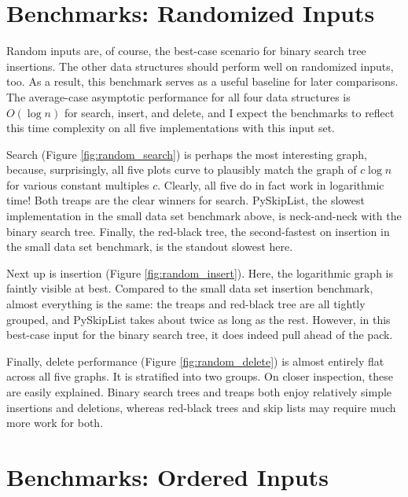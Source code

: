 \documentclass{article}
\begin{document}
\section{Benchmarks: Randomized Inputs}
Random inputs are, of course, the best-case scenario for binary search tree insertions. The other data structures should perform well on randomized inputs, too. As a result, this benchmark serves as a useful baseline for later comparisons. The average-case asymptotic performance for all four data structures is $O(\log n)$ for search, insert, and delete, and I expect the benchmarks to reflect this time complexity on all five implementations with this input set.

Search (Figure \ref{fig:random_search}) is perhaps the most interesting graph, because, surprisingly, all five plots curve to plausibly match the graph of $c \log n$ for various constant multiples $c$. Clearly, all five do in fact work in logarithmic time! Both treaps are the clear winners for search. PySkipList, the slowest implementation in the small data set benchmark above, is neck-and-neck with the binary search tree. Finally, the red-black tree, the second-fastest on insertion in the small data set benchmark, is the standout slowest here.



Next up is insertion (Figure \ref{fig:random_insert}). Here, the logarithmic graph is faintly visible at best. Compared to the small data set insertion benchmark, almost everything is the same: the treaps and red-black tree are all tightly grouped, and PySkipList takes about twice as long as the rest. However, in this best-case input for the binary search tree, it does indeed pull ahead of the pack.



Finally, delete performance (Figure \ref{fig:random_delete}) is almost entirely flat across all five graphs. It is stratified into two groups. On closer inspection, these are easily explained. Binary search trees and treaps both enjoy relatively simple insertions and deletions, whereas red-black trees and skip lists may require much more work for both.


\FloatBarrier %

\section{Benchmarks: Ordered Inputs}
\end{document}
